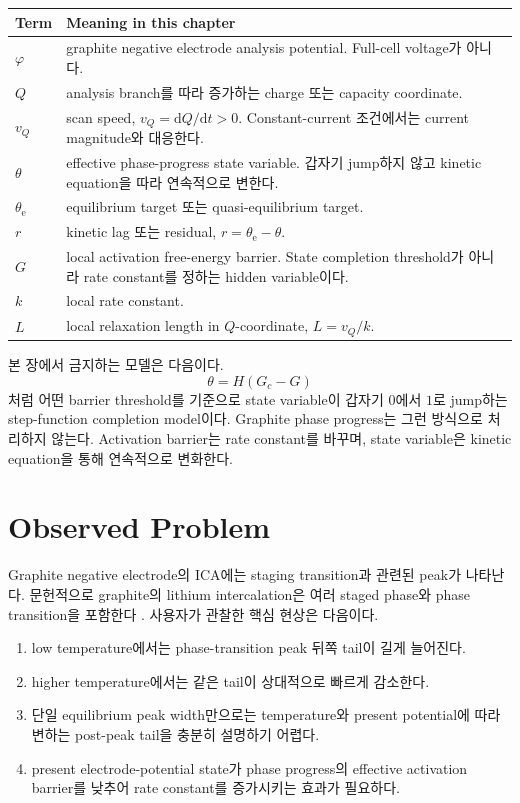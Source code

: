 \documentclass[11pt,a4paper]{article}
\newcommand{\dd}{\mathrm{d}}
\begin{document}
\begin{longtable}{p{}p{}}
\toprule
Term & Meaning in this chapter \\
\midrule
\endhead
\(\varphi\) & graphite negative electrode analysis potential. Full-cell voltage가 아니다. \\
\(Q\) & analysis branch를 따라 증가하는 charge 또는 capacity coordinate. \\
\(v_Q\) & scan speed, \(v_Q=\dd Q/\dd t>0\). Constant-current 조건에서는 current magnitude와 대응한다. \\
\(\theta\) & effective phase-progress state variable. 갑자기 jump하지 않고 kinetic equation을 따라 연속적으로 변한다. \\
\(\theta_{\mathrm e}\) & equilibrium target 또는 quasi-equilibrium target. \\
\(r\) & kinetic lag 또는 residual, \(r=\theta_{\mathrm e}-\theta\). \\
\(G\) & local activation free-energy barrier. State completion threshold가 아니라 rate constant를 정하는 hidden variable이다. \\
\(k\) & local rate constant. \\
\(L\) & local relaxation length in \(Q\)-coordinate, \(L=v_Q/k\). \\
\bottomrule
\end{longtable}

본 장에서 금지하는 모델은 다음이다.
\[
\theta = H(G_c-G)
\]
처럼 어떤 barrier threshold를 기준으로 state variable이 갑자기 \(0\)에서 \(1\)로 jump하는 step-function completion model이다. Graphite phase progress는 그런 방식으로 처리하지 않는다. Activation barrier는 rate constant를 바꾸며, state variable은 kinetic equation을 통해 연속적으로 변화한다.

\section{Observed Problem}

Graphite negative electrode의 ICA에는 staging transition과 관련된 peak가 나타난다. 문헌적으로 graphite의 lithium intercalation은 여러 staged phase와 phase transition을 포함한다 \cite{Dahn1991,Funabiki1999}. 사용자가 관찰한 핵심 현상은 다음이다.

\begin{enumerate}
\item low temperature에서는 phase-transition peak 뒤쪽 tail이 길게 늘어진다.
\item higher temperature에서는 같은 tail이 상대적으로 빠르게 감소한다.
\item 단일 equilibrium peak width만으로는 temperature와 present potential에 따라 변하는 post-peak tail을 충분히 설명하기 어렵다.
\item present electrode-potential state가 phase progress의 effective activation barrier를 낮추어 rate constant를 증가시키는 효과가 필요하다.
\end{enumerate}
\end{document}
